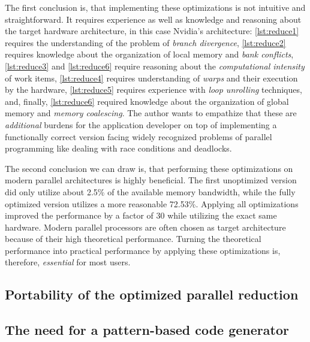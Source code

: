 The first conclusion is, that implementing these optimizations is not intuitive and straightforward.
It requires experience as well as knowledge and reasoning about the target hardware architecture, in this case Nvidia's \GPU architecture:
\autoref{lst:reduce1} requires the understanding of the problem of \emph{branch divergence}, \autoref{lst:reduce2} requires knowledge about the organization of local memory and \emph{bank conflicts}, \autoref{lst:reduce3} and \autoref{lst:reduce6} require reasoning about the \emph{computational intensity} of work items, \autoref{lst:reduce4} requires understanding of \emph{warps} and their execution by the hardware, \autoref{lst:reduce5} requires experience with \emph{loop unrolling} techniques, and, finally, \autoref{lst:reduce6} required knowledge about the organization of global memory and \emph{memory coalescing}.
The author wants to empathize that these are \emph{additional} burdens for the application developer on top of implementing a functionally correct version facing widely recognized problems of parallel programming like dealing with race conditions and deadlocks.

The second conclusion we can draw is, that performing these optimizations on modern parallel architectures is highly beneficial.
The first unoptimized version did only utilize about 2.5\% of the available memory bandwidth, while the fully optimized version utilizes a more reasonable 72.53\%.
Applying all optimizations improved the performance by a factor of $30$ while utilizing the exact same hardware.
Modern parallel processors are often chosen as target architecture because of their high theoretical performance.
Turning the theoretical performance into practical performance by applying these optimizations is, therefore, \emph{essential} for most users.





\subsection{Portability of the optimized parallel reduction}







\subsection{The need for a pattern-based code generator}


